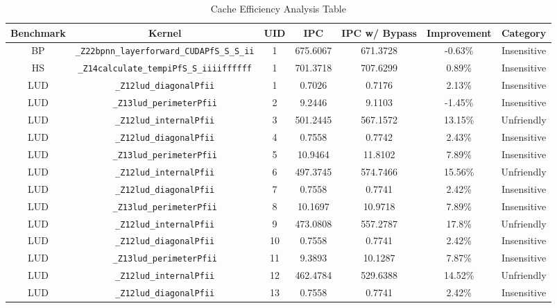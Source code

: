 \documentclass{article}
\begin{document}
\begin{table}[H]
\small
\caption{Cache Efficiency Analysis Table} %
\centering %
\begin{tabular}{c c c c c c c} %
\hline\hline %
Benchmark & Kernel & UID & IPC & IPC w/ Bypass & Improvement & Category \\ [0.5ex] %
\hline %
BP  & \verb|_Z22bpnn_layerforward_CUDAPfS_S_S_ii|    & 1  & 675.6067  & 671.3728 & -0.63\% & Insensitive \\ 
HS  & \verb|_Z14calculate_tempiPfS_S_iiiiffffff|     & 1  & 701.3718  & 707.6299 & 0.89\% & Insensitive\\  
LUD & \verb|_Z12lud_diagonalPfii|                    & 1  & 0.7026    & 0.7176   & 2.13\% & Insensitive\\
LUD & \verb|_Z13lud_perimeterPfii|                   & 2  & 9.2446    & 9.1103   & -1.45\% & Insensitive\\
LUD & \verb|_Z12lud_internalPfii|                    & 3  & 501.2445  & 567.1572 & 13.15\% &Unfriendly\\
LUD & \verb|_Z12lud_diagonalPfii|                    & 4  & 0.7558    & 0.7742   & 2.43\% &Insensitive\\
LUD & \verb|_Z13lud_perimeterPfii|                   & 5  & 10.9464   & 11.8102  & 7.89\% &Insensitive\\
LUD & \verb|_Z12lud_internalPfii|                    & 6  & 497.3745  & 574.7466 & 15.56\% &Unfriendly\\
LUD & \verb|_Z12lud_diagonalPfii|                    & 7  & 0.7558    & 0.7741   & 2.42\% &Insensitive\\
LUD & \verb|_Z13lud_perimeterPfii|                   & 8  & 10.1697   & 10.9718  & 7.89\% &Insensitive\\
LUD & \verb|_Z12lud_internalPfii|                    & 9  & 473.0808  & 557.2787 & 17.8\% &Unfriendly\\
LUD & \verb|_Z12lud_diagonalPfii|                    & 10 & 0.7558    & 0.7741   & 2.42\% &Insensitive\\
LUD & \verb|_Z13lud_perimeterPfii|                   & 11 & 9.3893    & 10.1287  & 7.87\% &Insensitive\\
LUD & \verb|_Z12lud_internalPfii|                    & 12 & 462.4784  & 529.6388 & 14.52\% &Unfriendly\\
LUD & \verb|_Z12lud_diagonalPfii|                    & 13 & 0.7558    & 0.7741   & 2.42\% &Insensitive\\

\end{tabular}
\end{table}
\end{document}
